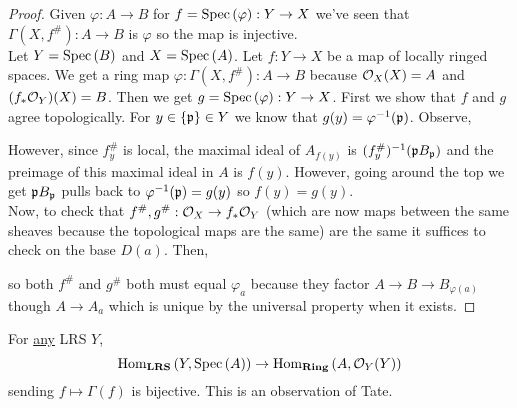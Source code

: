 \documentclass[12pt]{article}
\begin{document}
\begin{proof}
Given $\varphi : A \to B$ for $f = \mathrm{Spec}\left( \varphi \right) : Y \to X$ we've seen that $\Gamma(X, f^\#) : A \to B$ is $\varphi$ so the map is injective.
\bigskip\\
Let $Y = \mathrm{Spec}\left( B \right)$ and $X = \mathrm{Spec}\left( A \right)$. Let $f : Y \to X$ be a map of locally ringed spaces. We get a ring map $\varphi : \Gamma(X, f^\#) : A \to B$ because $\mathcal{O}_{X}(X) = A$ and $(f_* \mathcal{O}_{Y})(X) = B$. Then we get $g = \mathrm{Spec}\left( \varphi \right) : Y \to X$. First we show that $f$ and $g$ agree topologically. For $y \in \{ \mathfrak{p} \} \in Y$ we know that $g(y) = \varphi^{-1}(\mathfrak{p})$. Observe,
\begin{center}
\end{center}
However, since $f^\#_y$ is local, the maximal ideal of $A_{f(y)}$ is $(f^\#_y)^{-1}(\mathfrak{p} B_{\mathfrak{p}})$ and the preimage of this maximal ideal in $A$ is $f(y)$. However, going around the top we get $\mathfrak{p} B_{\mathfrak{p}}$ pulls back to $\varphi^{-1}(\mathfrak{p}) = g(y)$ so $f(y) = g(y)$. 
\bigskip\\
Now, to check that $f^\#, g^\# : \mathcal{O}_{X} \to f_* \mathcal{O}_{Y}$ (which are now maps between the same sheaves because the topological maps are the same) are the same it suffices to check on the base $D(a)$. Then,
\begin{center}
\end{center}
so both $f^\#$ and $g^\#$ both must equal $\varphi_a$ because they factor $A \to B \to B_{\varphi(a)}$ though $A \to A_a$ which is unique by the universal property when it exists.
\end{proof}

\begin{rmk}
For \underline{any} LRS $Y$,
\[ \mathrm{Hom}_{\mathbf{LRS}} \left( Y, \mathrm{Spec}\left( A \right) \right) \to \mathrm{Hom}_{\mathbf{Ring}} \left( A, \mathcal{O}_{Y}(Y) \right) \]
sending $f \mapsto \Gamma(f)$ is bijective. This is an observation of Tate. 
\end{rmk}
\end{document}
